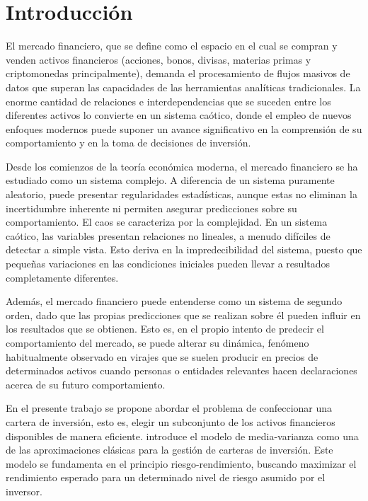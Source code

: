 \chapter{Introducción}

El mercado financiero, que se define como el espacio en el cual se compran y venden activos financieros (acciones, bonos, divisas, materias primas y criptomonedas principalmente), demanda el procesamiento de flujos masivos de datos que superan las capacidades de las herramientas analíticas tradicionales. La enorme cantidad de relaciones e interdependencias que se suceden entre los diferentes activos lo convierte en un sistema caótico, donde el empleo de nuevos enfoques modernos puede suponer un avance significativo en la comprensión de su comportamiento y en la toma de decisiones de inversión.

Desde los comienzos de la teoría económica moderna, el mercado financiero se ha estudiado como un sistema complejo. A diferencia de un sistema puramente aleatorio, puede presentar regularidades estadísticas, aunque estas no eliminan la incertidumbre inherente ni permiten asegurar predicciones sobre su comportamiento. El caos se caracteriza por la complejidad. En un sistema caótico, las variables presentan relaciones no lineales, a menudo difíciles de detectar a simple vista. Esto deriva en la impredecibilidad del sistema, puesto que pequeñas variaciones en las condiciones iniciales pueden llevar a resultados completamente diferentes.

Además, el mercado financiero puede entenderse como un sistema de segundo orden, dado que las propias predicciones que se realizan sobre él pueden influir en los resultados que se obtienen. Esto es, en el propio intento de predecir el comportamiento del mercado, se puede alterar su dinámica, fenómeno habitualmente observado en virajes que se suelen producir en precios de determinados activos cuando personas o entidades relevantes hacen declaraciones acerca de su futuro comportamiento.

En el presente trabajo se propone abordar el problema de confeccionar una cartera de inversión, esto es, elegir un subconjunto de los activos financieros disponibles de manera eficiente. \cite{markowitz1952} introduce el modelo de media-varianza como una de las aproximaciones clásicas para la gestión de carteras de inversión. Este modelo se fundamenta en el principio riesgo-rendimiento, buscando maximizar el rendimiento esperado para un determinado nivel de riesgo asumido por el inversor.

